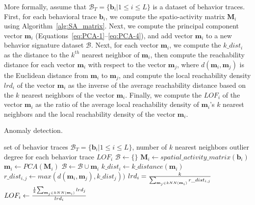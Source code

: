 More formally, assume that $\mathcal{B}_T=\{\mathbf{b}_i | 1 \leq i \leq L\}$ is a dataset of behavior traces. First, for each behavioral trace $\mathbf{b}_i$, we compute the spatio-activity matrix $\mathbf{M}_i$ using Algorithm~\ref{alg:SA_matrix}. Next, we compute the principal component vector $\mathbf{m}_i$ (Equations~\ref{eq:PCA-1}--\ref{eq:PCA-4}), and add vector $\mathbf{m}_i$ to a new behavior signature dataset $\mathcal{B}$. Next, for each vector $\mathbf{m}_i$, we compute the $k\_dist_i$ as the distance to the $k^{th}$ nearest neighbor of $\mathbf{m}_i$,  then compute the reachability distance for each vector $\mathbf{m}_i$ with respect to the vector $\mathbf{m}_j$, where $d(\mathbf{m}_i,\mathbf{m}_j)$ is the Euclidean distance from $\mathbf{m}_i$ to $\mathbf{m}_j$, and compute the local reachability density $lrd_i$ of the vector $\mathbf{m}_i$ as the inverse of the average reachability distance based on the $k$ nearest neighbors of the vector $\mathbf{m}_i$. Finally, we compute the $LOF_i$ of the vector $\mathbf{m}_i$ as the ratio of the average local reachability density of $\mathbf{m}_i$'s  $k$ nearest neighbors and the local reachability density of the vector $\mathbf{m}_i$.

\begin{algorithm}
\caption{Anomaly detection.}
\label{alg:LOF}
\begin{algorithmic}
\REQUIRE set of behavior traces $\mathcal{B}_T=\{\mathbf{b}_i | 1 \leq i \leq L\}$, number of $k$ nearest neighbors
\ENSURE outlier degree for each behavior trace $LOF_i$
\STATE $\mathcal{B} \gets \{\}$
	\STATE $\mathbf{M}_i \gets spatial\_activity\_matrix(\mathbf{b}_i)$
	\STATE $\mathbf{m}_i \gets PCA(\mathbf{M}_i)$
	\STATE $\mathcal{B} \gets \mathcal{B} \cup \mathbf{m}_i $
\ENDFOR
{}
	\STATE $k\_dist_i \gets k\_distance(\mathbf{m}_i)$
		\STATE $r\_dist_{i,j} \gets max(d(\mathbf{m}_i, \mathbf{m}_j), k\_dist_j))$
	\ENDFOR
	\STATE $lrd_i = {k \over { \sum_{\mathbf{m}_j\in kNN(\mathbf{m}_i)}{r\_dist_{i, j}}}}$
	\STATE $LOF_i \gets { {1 \over k}{{ \sum_{\mathbf{m}_j\in kNN(\mathbf{m}_i)}{lrd_j}}} \over lrd_i}$
\ENDFOR
\end{algorithmic}
\end{algorithm}



%
%
